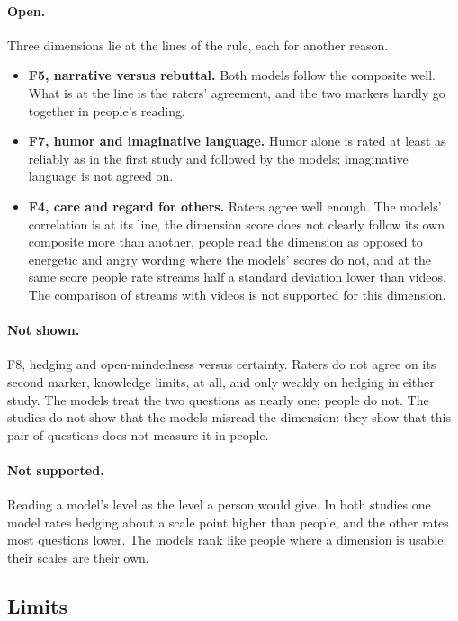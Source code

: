 \paragraph{Open.} Three dimensions lie at the lines of the rule, each for another reason.
\begin{itemize}
\item \textbf{F5, narrative versus rebuttal.} Both models follow the composite well. What is at the line is the
  raters' agreement, and the two markers hardly go together in people's reading.
\item \textbf{F7, humor and imaginative language.} Humor alone is rated at least as reliably as in the first
  study and followed by the models; imaginative language is not agreed on.
\item \textbf{F4, care and regard for others.} Raters agree well enough. The models' correlation is at its
  line, the dimension score does not clearly follow its own composite more than another, people read the
  dimension as opposed to energetic and angry wording where the models' scores do not, and at the same score
  people rate streams half a standard deviation lower than videos. The comparison of streams with videos is
  not supported for this dimension.
\end{itemize}

\paragraph{Not shown.} F8, hedging and open-mindedness versus certainty. Raters do not agree on its second
marker, knowledge limits, at all, and only weakly on hedging in either study. The models treat the two
questions as nearly one; people do not. The studies do not show that the models misread the dimension: they
show that this pair of questions does not measure it in people.

\paragraph{Not supported.} Reading a model's level as the level a person would give. In both studies one model
rates hedging about a scale point higher than people, and the other rates most questions lower. The models
rank like people where a dimension is usable; their scales are their own.

\subsection{Limits}\label{sec:limits}

